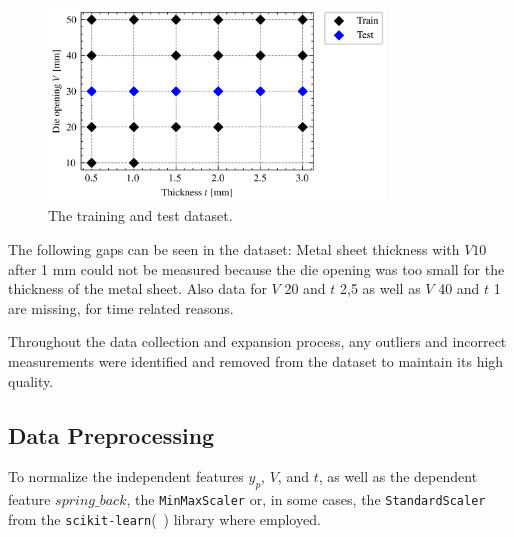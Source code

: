 \begin{figure}[h]
    \begin{tcolorbox}[arc=0pt,boxrule=0.5pt]
        \centering
        \includegraphics[width=0.8\textwidth]{chap4/images/test_train_split}
    \end{tcolorbox}
    \caption{The training and test dataset.}
    \label{fig:train_test_split}
\end{figure}

The following gaps can be seen in the dataset: Metal sheet thickness with $V10$  after 1 mm could not be measured
because the die opening was too small for the thickness of the metal sheet.
Also data for $V$ 20 and $t$ 2,5 as well as $V$ 40 and $t$ 1 are missing, for time related reasons.

Throughout the data collection and expansion process, any outliers and incorrect measurements were identified and
removed from the dataset to maintain its high quality.

\subsection{Data Preprocessing}\label{subsec:data-preprocessing}
To normalize the independent features $y_p$, $V$, and $t$, as well as the dependent feature $spring\_back$, the
\texttt{MinMaxScaler} or, in some cases, the \texttt{StandardScaler} from the
\texttt{scikit-learn}(~\cite{scikit-learn}) library where employed.


